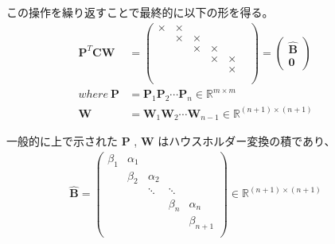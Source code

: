 \documentclass[a4paper,10pt]{jarticle}
\begin{document}
　この操作を繰り返すことで最終的に以下の形を得る。\\
\begin{align*}
\bm{P}^T\bm{C}\bm{W} &=
\begin{pmatrix}
\times & \times & & & \\
 & \times & \times& & \\
 & & \times & \times &  \\
&&&\times & \times  \\
&&&& \times   \\
&&&&& \\
\end{pmatrix}
=
\begin{pmatrix}
\hat{\bm{B}}\\
\bm{0}
\end{pmatrix} \\
where\ \bm{P} &= \bm{P}_1 \bm{P}_2 \cdots \bm{P}_n \in \mathbb{R}^{m \times m}\\
\bm{W} &= \bm{W}_1 \bm{W}_2 \cdots \bm{W}_{n-1} \in \mathbb{R}^{(n+1)\times(n+1)}
 \tag{2}
\end{align*}

　一般的に上で示された \(\bm{P}\) , \(\bm{W}\) はハウスホルダー変換の積であり、\\
\begin{align*}
\hat{\bm{B}} =
\begin{pmatrix}
\beta_1& \alpha_1& & & \\
&\beta_2& \alpha_2&  & \\
&&\ddots& \ddots &   \\
&&& \beta_n& \alpha_n   \\
&&&& \beta_{n+1}   \\
\end{pmatrix}
\in \mathbb{R}^{(n+1)\times(n+1)}
\end{align*}
\end{document}
